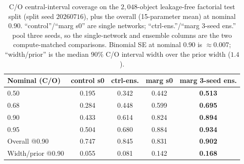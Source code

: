 \documentclass{article}
\begin{document}
\begin{table}[h]
\centering
\caption{C/O central-interval coverage on the $2{,}048$-object leakage-free
factorial test split (split seed $20260716$), plus the overall (15-parameter
mean) at nominal $0.90$. ``control''/``marg s0'' are single networks;
``ctrl-ens.''/``marg 3-seed ens.'' pool three seeds, so the single-network and
ensemble columns are the two compute-matched comparisons. Binomial SE at nominal
$0.90$ is $\approx0.007$; ``width/prior'' is the median $90\%$ C/O interval
width over the prior width ($1.4$).}
\label{tab:coverage}
\begin{tabular}{lcccc}
\toprule
Nominal (C/O) & control s0 & ctrl-ens. & marg s0 & \textbf{marg 3-seed ens.} \\
\midrule
0.50 & 0.195 & 0.342 & 0.442 & \textbf{0.513} \\
0.68 & 0.284 & 0.448 & 0.599 & \textbf{0.695} \\
0.90 & 0.433 & 0.614 & 0.824 & \textbf{0.894} \\
0.95 & 0.504 & 0.680 & 0.884 & \textbf{0.934} \\
\midrule
Overall @0.90     & 0.747 & 0.845 & 0.831 & \textbf{0.902} \\
Width/prior @0.90 & 0.055 & 0.081 & 0.142 & \textbf{0.168} \\
\bottomrule
\end{tabular}
\end{table}
\end{document}
